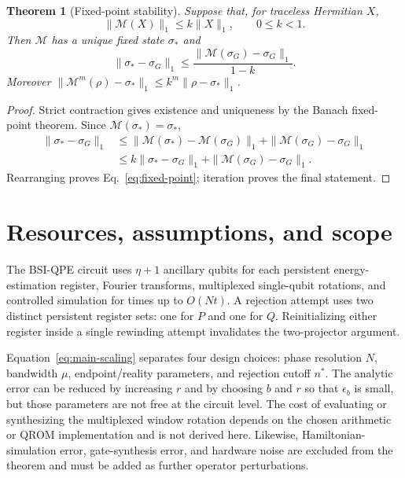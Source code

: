 \documentclass[aps,floatfix,10pt,amssymb,amsmath,superscriptaddress,nofootinbib,longbibliography,nobalancelastpage,twocolumn]{revtex4-2}
\newtheorem{theorem}{Theorem}
\newcommand{\cM}{\mathcal{M}}
\begin{document}
\begin{theorem}[Fixed-point stability]
\label{thm:fixed-point}
Suppose that, for traceless Hermitian $X$,
\begin{equation}
 \|\cM(X)\|_1\leq k\|X\|_1,
 \qquad 0\leq k<1.
 \label{eq:contraction}
\end{equation}
Then $\cM$ has a unique fixed state $\sigma_*$ and
\begin{equation}
 \|\sigma_*-\sigma_G\|_1
 \leq\frac{\|\cM(\sigma_G)-\sigma_G\|_1}{1-k}.
 \label{eq:fixed-point}
\end{equation}
Moreover $\|\cM^m(\rho)-\sigma_*\|_1\leq k^m\|\rho-\sigma_*\|_1$.
\end{theorem}
\begin{proof}
Strict contraction gives existence and uniqueness by the Banach fixed-point theorem.  Since $\cM(\sigma_*)=\sigma_*$,
\begin{align}
 \|\sigma_*-\sigma_G\|_1
 &\leq\|\cM(\sigma_*)-\cM(\sigma_G)\|_1
 +\|\cM(\sigma_G)-\sigma_G\|_1\\
 &\leq k\|\sigma_*-\sigma_G\|_1
 +\|\cM(\sigma_G)-\sigma_G\|_1.
\end{align}
Rearranging proves Eq.~\eqref{eq:fixed-point}; iteration proves the final statement.
\end{proof}

\section{Resources, assumptions, and scope}

The BSI-QPE circuit uses $\eta+1$ ancillary qubits for each persistent energy-estimation register, Fourier transforms, multiplexed single-qubit rotations, and controlled simulation for times up to $O(Nt)$.  A rejection attempt uses two distinct persistent register sets: one for $P$ and one for $Q$.  Reinitializing either register inside a single rewinding attempt invalidates the two-projector argument.

Equation~\eqref{eq:main-scaling} separates four design choices: phase resolution $N$, bandwidth $\mu$, endpoint/reality parameters, and rejection cutoff $n^*$.  The analytic error can be reduced by increasing $r$ and by choosing $b$ and $r$ so that $\epsilon_b$ is small, but those parameters are not free at the circuit level.  The cost of evaluating or synthesizing the multiplexed window rotation depends on the chosen arithmetic or QROM implementation and is not derived here.  Likewise, Hamiltonian-simulation error, gate-synthesis error, and hardware noise are excluded from the theorem and must be added as further operator perturbations.
\end{document}
